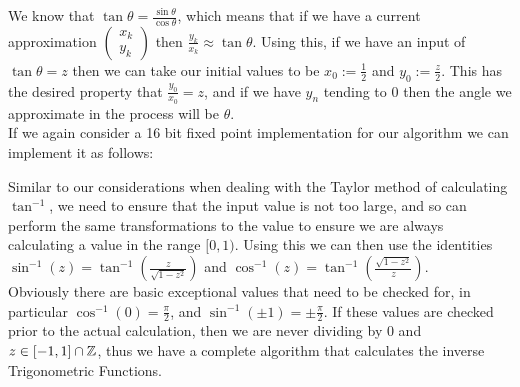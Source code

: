 {We know that \(\tan\theta = \frac{\sin\theta}{\cos\theta}\), which means that if we have a current approximation \(\left(\begin{array}{c}x_k\\y_k\end{array}\right)\) then \(\frac{y_k}{x_k} \approx \tan\theta\). Using this, if we have an input of \(\tan\theta = z\) then we can take our initial values to be \(x_0 := \tfrac{1}{2}\) and \(y_0 := \tfrac{z}{2}\). This has the desired property that \(\tfrac{y_0}{x_0} = z\), and if we have \(y_n\) tending to 0 then the angle we approximate in the process will be \(\theta\). \\

If we again consider a 16 bit fixed point implementation for our algorithm we can implement it as follows:


Similar to our considerations when dealing with the Taylor method of calculating \(\tan^{-1}\), we need to ensure that the input value is not too large, and so can perform the same transformations to the value to ensure we are always calculating a value in the range \([0,1)\). Using this we can then use the identities \(\sin^{-1}(z) = \tan^{-1}(\frac{z}{\sqrt{1-z^2}})\) and \(\cos^{-1}(z) = \tan^{-1}(\frac{\sqrt{1 - z^2}}{z})\). \\

Obviously there are basic exceptional values that need to be checked for, in particular \(\cos^{-1}(0) = \tfrac{\pi}{2}\), and \(\sin^{-1}(\pm1) = \pm\tfrac{\pi}{2}\). If these values are checked prior to the actual calculation, then we are never dividing by 0 and \(z \in [-1,1]\cap\mathbb{Z}\), thus we have a complete algorithm that calculates the inverse Trigonometric Functions.\\

}
